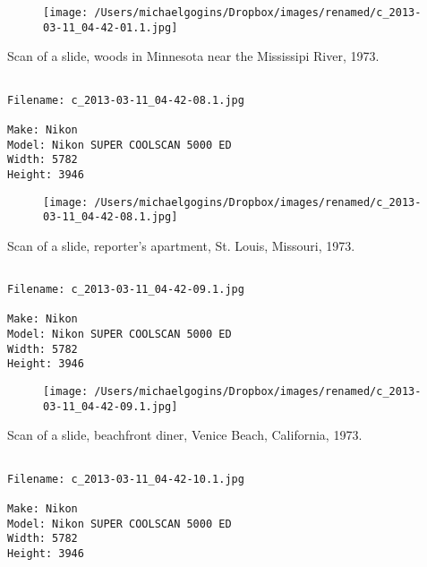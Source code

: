 \documentclass[11pt,letter,DIV=14,paper=landscape]{scrbook}
\begin{document}
\begin{figure}
\texttt{[image: /Users/michaelgogins/Dropbox/images/renamed/c\_2013-03-11\_04-42-01.1.jpg]}
\end{figure}
    
\clearpage
\noindent Scan of a slide, woods in Minnesota near the Mississipi River, 1973.
\noindent
\begin{lstlisting}

Filename: c_2013-03-11_04-42-08.1.jpg

Make: Nikon
Model: Nikon SUPER COOLSCAN 5000 ED
Width: 5782
Height: 3946
\end{lstlisting}
\clearpage

\begin{figure}
\texttt{[image: /Users/michaelgogins/Dropbox/images/renamed/c\_2013-03-11\_04-42-08.1.jpg]}
\end{figure}
    
\clearpage
\noindent Scan of a slide, reporter's apartment, St. Louis, Missouri, 1973.
\noindent
\begin{lstlisting}

Filename: c_2013-03-11_04-42-09.1.jpg

Make: Nikon
Model: Nikon SUPER COOLSCAN 5000 ED
Width: 5782
Height: 3946
\end{lstlisting}
\clearpage

\begin{figure}
\texttt{[image: /Users/michaelgogins/Dropbox/images/renamed/c\_2013-03-11\_04-42-09.1.jpg]}
\end{figure}
    
\clearpage
\noindent Scan of a slide, beachfront diner, Venice Beach, California, 1973.
\noindent
\begin{lstlisting}

Filename: c_2013-03-11_04-42-10.1.jpg

Make: Nikon
Model: Nikon SUPER COOLSCAN 5000 ED
Width: 5782
Height: 3946
\end{lstlisting}
\clearpage
\end{document}
